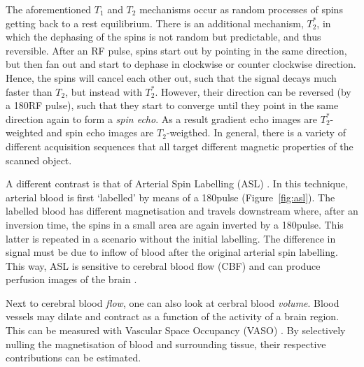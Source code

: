 The aforementioned $T_1$ and $T_2$ mechanisms occur as random processes of spins getting back to a rest equilibrium. There is an additional mechanism, $T_2^*$, in which the dephasing of the spins is not random but predictable, and thus reversible. After an RF pulse, spins start out by pointing in the same direction, but then fan out and start to dephase in clockwise or counter clockwise direction. Hence, the spins will cancel each other out, such that the signal decays much faster than $T_2$, but instead with $T_2^*$. However, their direction can be reversed (by a 180\textdegree RF pulse), such that they start to converge until they point in the same direction again to form a \emph{spin echo}. As a result gradient echo images are $T_2^*$-weighted and spin echo images are $T_2$-weigthed. In general, there is a variety of different acquisition sequences that all target different magnetic properties of the scanned object.

A different contrast is that of Arterial Spin Labelling (ASL) \cite{Williams1992,Detre1994}. In this technique, arterial blood is first `labelled' by means of a 180\textdegree pulse (Figure~\ref{fig:asl}). The labelled blood has different magnetisation and travels downstream where, after an inversion time, the spins in a small area are again inverted by a 180\textdegree pulse. This latter is repeated in a scenario without the initial labelling. The difference in signal must be due to inflow of blood after the original arterial spin labelling. This way, ASL is sensitive to cerebral blood flow (CBF) and can produce perfusion images of the brain \cite{Petcharunpaisan2010}.


Next to cerebral blood \emph{flow}, one can also look at cerbral blood \emph{volume}. Blood vessels may dilate and contract as a function of the activity of a brain region. This can be measured with Vascular Space Occupancy (VASO) \cite{Lu2003}. By selectively nulling the magnetisation of blood and surrounding tissue, their respective contributions can be estimated.

